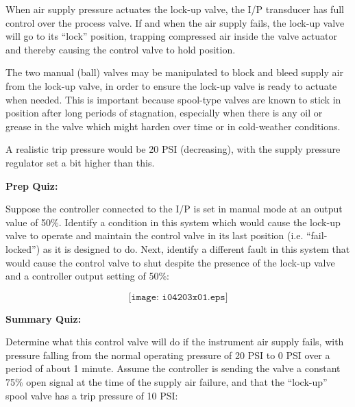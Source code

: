 





When air supply pressure actuates the lock-up valve, the I/P transducer has full control over the process valve.  If and when the air supply fails, the lock-up valve will go to its ``lock'' position, trapping compressed air inside the valve actuator and thereby causing the control valve to hold position.







The two manual (ball) valves may be manipulated to block and bleed supply air from the lock-up valve, in order to ensure the lock-up valve is ready to actuate when needed.  This is important because spool-type valves are known to stick in position after long periods of stagnation, especially when there is any oil or grease in the valve which might harden over time or in cold-weather conditions.

\vskip 10pt

A realistic trip pressure would be 20 PSI (decreasing), with the supply pressure regulator set a bit higher than this.




\vfil \eject

\noindent
{\bf Prep Quiz:}

Suppose the controller connected to the I/P is set in manual mode at an output value of 50\%.  Identify a condition in this system which would cause the lock-up valve to operate and maintain the control valve in its last position (i.e. ``fail-locked'') as it is designed to do.  Next, identify a different fault in this system that would cause the control valve to shut despite the presence of the lock-up valve and a controller output setting of 50\%:

$$\texttt{[image: i04203x01.eps]}$$













\vfil \eject

\noindent
{\bf Summary Quiz:}

Determine what this control valve will do if the instrument air supply fails, with pressure falling from the normal operating pressure of 20 PSI to 0 PSI over a period of about 1 minute.  Assume the controller is sending the valve a constant 75\% open signal at the time of the supply air failure, and that the ``lock-up'' spool valve has a trip pressure of 10 PSI:

